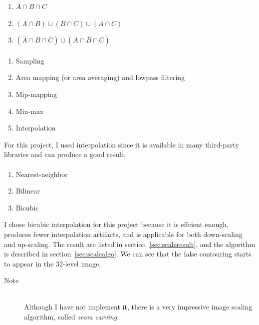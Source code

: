 \documentclass{article}
\begin{document}
\begin{enumerate}
\item $A \cap B \cap C$
\item $(A \cap B) \cup (B \cap C) \cup (A \cap C)$
\item $(\overline{A} \cap B \cap \overline{C}) \cup (A \cap \overline{B} \cap C)$
\end{enumerate}


\paragraph{}
\begin{enumerate}
\item Sampling
\item Area mapping (or area averaging) and lowpass filtering
\item Mip-mapping
\item Min-max
\item Interpolation \label{lastscale}
\end{enumerate}

For this project, I used interpolation since it is available in many third-party libraries and can produce a good result.

\paragraph{}

\begin{enumerate}
\item Nearest-neighbor
\item Bilinear
\item Bicubic \label{lastinterpolation}
\end{enumerate}

I chose bicubic interpolation for this project because it is effcient enough, produces fewer interpolation artifacts, and is applicable for both down-scaling and up-scaling. The result are listed in section~\ref{sec:scaleresult}, and the algorithm is described in section~\ref{sec:scalealgo}. We can see that the false contouring starts to appear in the 32-level image.

\begin{description}
\item[Note] \hfill \\
Although I have not implement it, there is a very impressive image scaling algorithm, called \textit{seam carving}
\end{description}
\end{document}
